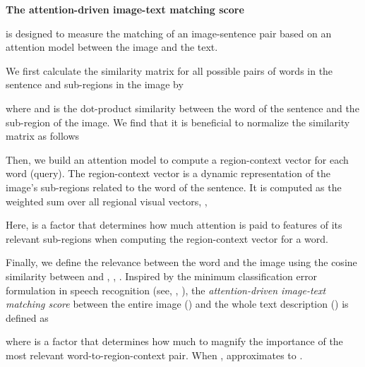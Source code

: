 \documentclass[10pt,twocolumn,letterpaper]{article}
\begin{document}
\textbf{The attention-driven image-text matching score }{
is designed to measure the matching of an image-sentence pair based on an attention model between the image and the text. 

We first calculate the similarity matrix for all possible pairs of words in the sentence and sub-regions in the image by

where  and  is the dot-product similarity between the  word of the sentence and the  sub-region of the image. We find that it is beneficial to normalize the similarity matrix as follows



Then, we build an attention model to compute a region-context vector for each word (query). The region-context vector  is a dynamic representation of the image's sub-regions related to the  word of the sentence. It is computed as the weighted sum over all regional visual vectors, \ie,

Here,  is a factor that determines how much attention is paid to features of its relevant sub-regions when computing the region-context vector for a word. 


Finally, we define the relevance between the  word and the image using the cosine similarity between  and , \ie, . 
Inspired by the minimum classification error formulation in speech recognition (see, \eg, \cite{Juang97minimum, he08discriminatice}), the \textit{attention-driven image-text matching score} between the entire image () and the whole text description () is defined as

where  is a factor that determines how much to magnify the importance of the most relevant word-to-region-context pair. When ,  approximates to .
}
\end{document}

